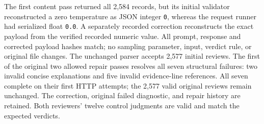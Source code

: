 The first content pass returned all 2,584 records, but its initial validator
reconstructed a zero temperature as JSON integer \texttt{0}, whereas the
request runner had serialized float \texttt{0.0}. A separately recorded
correction reconstructs the exact payload from the verified recorded numeric
value. All prompt, response and corrected payload hashes match; no sampling
parameter, input, verdict rule, or original file changes. The unchanged parser
accepts 2,577 initial reviews. The first of the original two allowed repair
passes resolves all seven structural failures: two invalid concise explanations
and five invalid evidence-line references. All seven complete on their first
HTTP attempts; the 2,577 valid original reviews remain unchanged. The correction,
original failed diagnostic, and repair history are retained. Both reviewers'
twelve control judgments are valid and match the expected verdicts.
